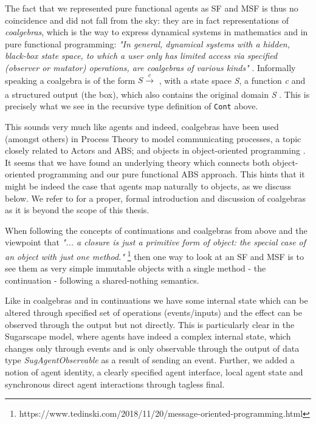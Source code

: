 The fact that we represented pure functional agents as SF and MSF is thus no coincidence and did not fall from the sky: they are in fact representations of \textit{coalgebras}, which is the way to express dynamical systems in mathematics and in pure functional programming: \textit{"In general, dynamical systems with a hidden, black-box state space, to which a user only has limited access via specified (observer or mutator) operations, are coalgebras of various kinds"} \cite{jacobs_tutorial_1997}. Informally speaking a coalgebra is of the form $S \xrightarrow[\text{}]{c} $ , with a state space \textit{S}, a function \textit{c} and a structured output (the box), which also contains the original domain \textit{S} \cite{jacobs_introduction_2017}. This is precisely what we see in the recursive type definition of \texttt{Cont} above.

This sounds very much like agents and indeed, coalgebras have been used (amongst others) in Process Theory to model communicating processes, a topic closely related to Actors and ABS; and objects in object-oriented programming \cite{jacobs_coalgebras_2003}. It seems that we have found an underlying theory which connects both object-oriented programming and our pure functional ABS approach. This hints that it might be indeed the case that agents map naturally to objects, as we discuss below. We refer to \cite{jacobs_introduction_2017, jacobs_tutorial_1997} for a proper, formal introduction and discussion of coalgebras as it is beyond the scope of this thesis.


When following the concepts of continuations and coalgebras from above and the viewpoint that \textit{"... a closure is just a primitive form of object: the special case of an object with just one method."} \footnote{https://www.tedinski.com/2018/11/20/message-oriented-programming.html} then one way to look at an SF and MSF is to see them as very simple immutable objects with a single method - the continuation - following a shared-nothing semantics. 

Like in coalgebras and in continuations we have some internal state which can be altered through specified set of operations (events/inputs) and the effect can be observed through the output but not directly. This is particularly clear in the Sugarscape model, where agents have indeed a complex internal state, which changes only through events and is only observable through the output of data type \textit{SugAgentObservable} as a result of sending an event. Further, we added a notion of agent identity, a clearly specified agent interface, local agent state and synchronous direct agent interactions through tagless final.

